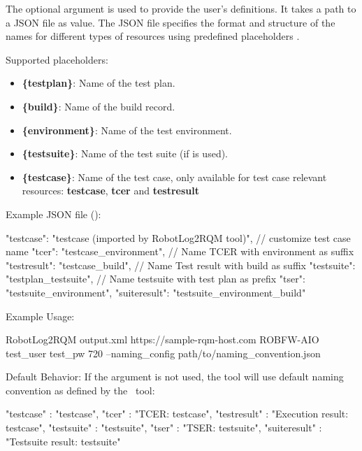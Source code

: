 The optional argument  is used to provide the user's
definitions. It takes a path to a JSON file as value.
The JSON file specifies the format and structure of the names for different
types of resources using predefined placeholders .

Supported placeholders:
\begin{itemize}
  \item \textbf{\{testplan\}}: Name of the test plan.
  \item \textbf{\{build\}}: Name of the build record.
  \item \textbf{\{environment\}}: Name of the test environment.
  \item \textbf{\{testsuite\}}: Name of the test suite (if  is used).
  \item \textbf{\{testcase\}}: Name of the test case, only available for test case relevant
        resources: \textbf{testcase}, \textbf{tcer} and \textbf{testresult}
\end{itemize}

Example JSON file ():
\begin{pythoncode}
{
  "testcase": "{testcase} (imported by RobotLog2RQM tool)", // customize test case name
  "tcer": "{testcase}_{environment}", // Name TCER with environment as suffix
  "testresult": "{testcase}_{build}", // Name Test result with build as suffix
  "testsuite": "{testplan}_{testsuite}",  // Name testsuite with test plan as prefix
  "tser": "{testsuite}_{environment}",
  "suiteresult": "{testsuite}_{environment}_{build}"
}
\end{pythoncode}

Example Usage:
\begin{robotlog}
  RobotLog2RQM output.xml https://sample-rqm-host.com ROBFW-AIO test_user test_pw 720 --naming_config path/to/naming_convention.json
\end{robotlog}

\begin{boxhint} {Default Behavior:}
If the  argument is not used, the tool will use default
naming convention as defined by the \pkg\ tool:
\begin{pythoncode}
{
  "testcase"    : "{testcase}",
  "tcer"        : "TCER: {testcase}",
  "testresult"  : "Execution result: {testcase}",
  "testsuite"   : "{testsuite}",
  "tser"        : "TSER: {testsuite}",
  "suiteresult" : "Testsuite result: {testsuite}"
}
\end{pythoncode}
\end{boxhint}

